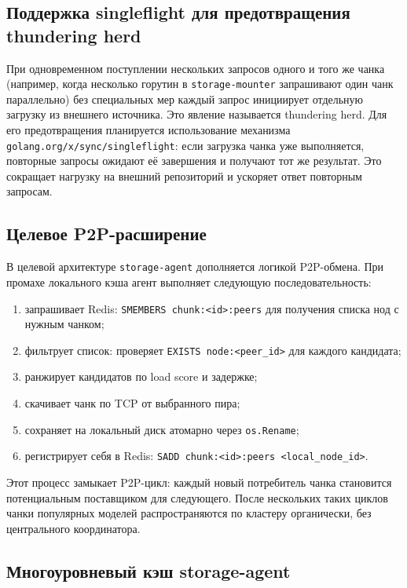 \subsection*{Поддержка singleflight для предотвращения thundering herd}

При одновременном поступлении нескольких запросов одного и того же чанка (например, когда несколько горутин в \texttt{storage-mounter} запрашивают один чанк параллельно) без специальных мер каждый запрос инициирует отдельную загрузку из внешнего источника. Это явление называется thundering herd. Для его предотвращения планируется использование механизма \texttt{golang.org/x/sync/singleflight}: если загрузка чанка уже выполняется, повторные запросы ожидают её завершения и получают тот же результат. Это сокращает нагрузку на внешний репозиторий и ускоряет ответ повторным запросам.

\subsection*{Целевое P2P-расширение}

В целевой архитектуре \texttt{storage-agent} дополняется логикой P2P-обмена. При промахе локального кэша агент выполняет следующую последовательность:
\begin{enumerate}[leftmargin=*]
  \item запрашивает Redis: \texttt{SMEMBERS chunk:<id>:peers} для получения списка нод с нужным чанком;
  \item фильтрует список: проверяет \texttt{EXISTS node:<peer\_id>} для каждого кандидата;
  \item ранжирует кандидатов по load score и задержке;
  \item скачивает чанк по TCP от выбранного пира;
  \item сохраняет на локальный диск атомарно через \texttt{os.Rename};
  \item регистрирует себя в Redis: \texttt{SADD chunk:<id>:peers <local\_node\_id>}.
\end{enumerate}

Этот процесс замыкает P2P-цикл: каждый новый потребитель чанка становится потенциальным поставщиком для следующего. После нескольких таких циклов чанки популярных моделей распространяются по кластеру органически, без центрального координатора.

\subsection*{Многоуровневый кэш storage-agent}

